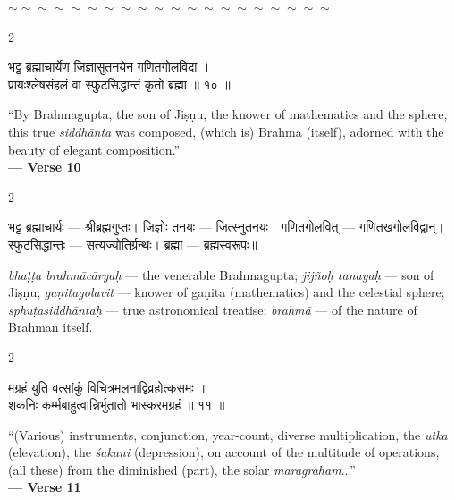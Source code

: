 \documentclass[11pt,a4paper]{article}
\newcommand{\dev}[1]{{\devanagarifont #1}}
\newenvironment{bilingualverse}{%
  \begin{paracol}{2}
  \fontsize{10.5}{13}\selectfont
}{%
  \end{paracol}
  \vspace{0.3cm}
}
\newcommand{\wavydivider}{\begin{center}$\sim\sim\sim\sim\sim\sim\sim\sim\sim\sim\sim\sim\sim\sim\sim\sim\sim\sim\sim\sim$\end{center}}
\begin{document}
\wavydivider

\begin{bilingualverse}
\begin{leftcolumn*}
\dev{भट्ट ब्रह्माचार्येण जिज्ञासुतनयेन गणितगोलविदा ।}\\
\dev{प्रायःश्लेषसंहलं वा स्फुटसिद्धान्तं कृतो ब्रह्मा ॥ १० ॥}
\end{leftcolumn*}
\begin{rightcolumn}
``By Brahmagupta, the son of Jiṣṇu, the knower of mathematics and the sphere, this true \textit{siddhānta} was composed, (which is) Brahma (itself), adorned with the beauty of elegant composition.''\\[0.3cm]
\hfill\textbf{— Verse 10}
\end{rightcolumn}
\end{bilingualverse}

\begin{paracol}{2}
\begin{leftcolumn*}
\dev{भट्ट ब्रह्माचार्यः} — श्रीब्रह्मगुप्तः। \dev{जिज्ञोः तनयः} — जित्स्नुतनयः। \dev{गणितगोलवित्} — गणितखगोलविद्वान्। \dev{स्फुटसिद्धान्तः} — सत्यज्योतिर्ग्रन्थः। \dev{ब्रह्मा} — ब्रह्मस्वरूपः॥
\end{leftcolumn*}
\begin{rightcolumn}
\textit{bhaṭṭa brahmācāryaḥ} --- the venerable Brahmagupta; \textit{jijñoḥ tanayaḥ} --- son of Jiṣṇu; \textit{gaṇitagolavit} --- knower of gaṇita (mathematics) and the celestial sphere; \textit{sphuṭasiddhāntaḥ} --- true astronomical treatise; \textit{brahmā} --- of the nature of Brahman itself.
\end{rightcolumn}
\end{paracol}

\vspace{0.4cm}

\begin{bilingualverse}
\begin{leftcolumn*}
\dev{मग्रहं युति वत्सांकुं विचित्रमलनाद्विव्रहोत्कसमः ।}\\
\dev{शकनिः कर्म्मबाहुत्वान्निर्भुतातो भास्करमग्रहं ॥ ११ ॥}
\end{leftcolumn*}
\begin{rightcolumn}
``(Various) instruments, conjunction, year-count, diverse multiplication, the \textit{utka} (elevation), the \textit{śakani} (depression), on account of the multitude of operations, (all these) from the diminished (part), the solar \textit{maragraham}...''\\[0.3cm]
\hfill\textbf{— Verse 11}
\end{rightcolumn}
\end{bilingualverse}
\end{document}
